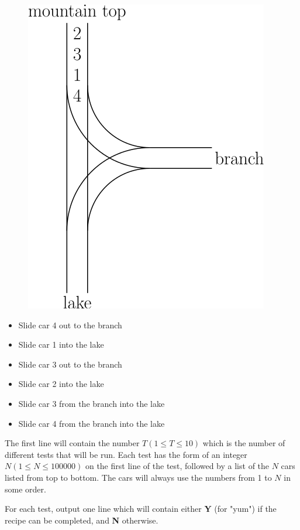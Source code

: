 \documentclass{problem-set}
\begin{document}
\begin{figure}[h]
    \centering
    \includegraphics[scale=0.5]{the-candy-mountain-2}
\end{figure}

\begin{itemize}
    \item Slide car 4 out to the branch
    \item Slide car 1 into the lake
    \item Slide car 3 out to the branch
    \item Slide car 2 into the lake
    \item Slide car 3 from the branch into the lake
    \item Slide car 4 from the branch into the lake
\end{itemize}

The first line will contain the number $T (1 \leq T \leq 10)$ which is the number of different tests that will be run. Each test has the form of an integer $N (1 \leq N \leq 100000)$ on the first line of the test, followed by a list of the $N$ cars listed from top to bottom. The cars will always use the numbers from 1 to $N$ in some order.

\pushnewpage

\outputformat
For each test, output one line which will contain either  \textbf{Y} (for "yum") if the recipe can be completed, and  \textbf{N} otherwise.
\end{document}
